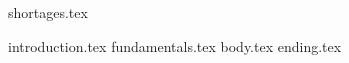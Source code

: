 \documentclass[runningheads]{llncs}
\begin{document}


{shortages.tex}

\newpage

{introduction.tex}
{fundamentals.tex}
{body.tex}
{ending.tex}



\printbibliography

\end{document}
